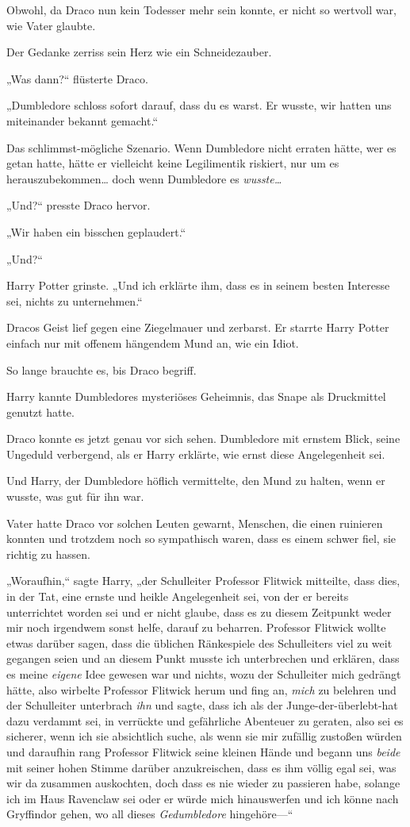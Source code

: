 {Obwohl, da Draco nun kein Todesser mehr sein konnte, er nicht so wertvoll war, wie Vater glaubte.

Der Gedanke zerriss sein Herz wie ein Schneidezauber.

„Was dann?“ flüsterte Draco.

„Dumbledore schloss sofort darauf, dass du es warst. Er wusste, wir hatten uns miteinander bekannt gemacht.“

Das schlimmst-mögliche Szenario. Wenn Dumbledore nicht erraten hätte, wer es getan hatte, hätte er vielleicht keine Legilimentik riskiert, nur um es herauszubekommen… doch wenn Dumbledore es \emph{wusste…}

„Und?“ presste Draco hervor.

„Wir haben ein bisschen geplaudert.“

„Und?“

Harry Potter grinste. „Und ich erklärte ihm, dass es in seinem besten Interesse sei, nichts zu unternehmen.“

Dracos Geist lief gegen eine Ziegelmauer und zerbarst. Er starrte Harry Potter einfach nur mit offenem hängendem Mund an, wie ein Idiot.

So lange brauchte es, bis Draco begriff.

Harry kannte Dumbledores mysteriöses Geheimnis, das Snape als Druckmittel genutzt hatte.

Draco konnte es jetzt genau vor sich sehen. Dumbledore mit ernstem Blick, seine Ungeduld verbergend, als er Harry erklärte, wie ernst diese Angelegenheit sei.

Und Harry, der Dumbledore höflich vermittelte, den Mund zu halten, wenn er wusste, was gut für ihn war.

Vater hatte Draco vor solchen Leuten gewarnt, Menschen, die einen ruinieren konnten und trotzdem noch so sympathisch waren, dass es einem schwer fiel, sie richtig zu hassen.

„Woraufhin,“ sagte Harry, „der Schulleiter Professor Flitwick mitteilte, dass dies, in der Tat, eine ernste und heikle Angelegenheit sei, von der er bereits unterrichtet worden sei und er nicht glaube, dass es zu diesem Zeitpunkt weder mir noch irgendwem sonst helfe, darauf zu beharren. Professor Flitwick wollte etwas darüber sagen, dass die üblichen Ränkespiele des Schulleiters viel zu weit gegangen seien und an diesem Punkt musste ich unterbrechen und erklären, dass es meine \emph{eigene} Idee gewesen war und nichts, wozu der Schulleiter mich gedrängt hätte, also wirbelte Professor Flitwick herum und fing an, \emph{mich} zu belehren und der Schulleiter unterbrach \emph{ihn} und sagte, dass ich als der Junge-der-überlebt-hat dazu verdammt sei, in verrückte und gefährliche Abenteuer zu geraten, also sei es sicherer, wenn ich sie absichtlich suche, als wenn sie mir zufällig zustoßen würden und daraufhin rang Professor Flitwick seine kleinen Hände und begann uns \emph{beide} mit seiner hohen Stimme darüber anzukreischen, dass es ihm völlig egal sei, was wir da zusammen auskochten, doch dass es nie wieder zu passieren habe, solange ich im Haus Ravenclaw sei oder er würde mich hinauswerfen und ich könne nach Gryffindor gehen, wo all dieses \emph{Gedumbledore} hingehöre—“

}
